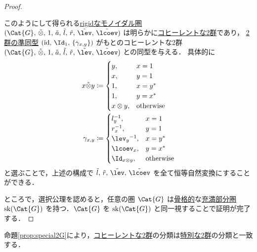 \documentclass[TQFT_main]{subfiles}
\begin{document}
\begin{proof}
\begin{center}
    \end{center}
    このようにして得られる\hyperref[redef:rigid]{rigidなモノイダル圏} $(\Cat{G},\, \tilde{\otimes},\, 1,\, \tilde{a},\, \tilde{l},\, \tilde{r},\, \tilde{\lev},\, \tilde{\lcoev})$ は明らかに\hyperref[def:W2G-C2G]{コヒーレントな2群}であり，
    \hyperref[def:hom2G]{2群の準同型} $(\mathrm{id},\, \Id_1,\, \{\gamma_{x,y}\})$ がもとのコヒーレントな2群 $(\Cat{G},\, \tilde{\otimes},\, 1,\, \tilde{a},\, \tilde{l},\, \tilde{r},\, \tilde{\lev},\, \tilde{\lcoev})$ との同型を与える．
    具体的に
    \begin{align}
        x \tilde{\otimes} y
        &\coloneqq \begin{cases}
            y, &x = 1 \\
            x, &y = 1 \\
            1, &x = y^* \\
            1, &y = x^* \\
            x \otimes y, &\text{otherwise}
        \end{cases} \\
        \gamma_{x,y}
        &\coloneqq \begin{cases}
            l_y^{-1}, &x = 1 \\
            r_x^{-1}, &y = 1 \\
            \lev_y{}^{-1}, &x = y^* \\
            \lcoev_x, &y = x^* \\
            \Id_{x \otimes y}, &\text{otherwise}
        \end{cases}
    \end{align}
    と選ぶことで，上述の構成で $\tilde{l},\, \tilde{r},\, \tilde{\lev},\, \tilde{\lcoev}$ を全て恒等自然変換にすることができる．

    ところで，選択公理を認めると，任意の圏 $\Cat{G}$ は\hyperref[def:skeltal2G]{骨格的}な\hyperref[def:faithful]{充満部分圏} $\mathrm{sk}(\Cat{G})$ を持つ．$\Cat{G}$ を $\mathrm{sk}(\Cat{G})$ と同一視することで証明が完了する．
\end{proof}

命題\ref{prop:special2G}により，\hyperref[def:W2G-C2G]{コヒーレントな2群}の分類は\hyperref[def:special2G]{特別な2群}の分類と一致する．
\end{document}
